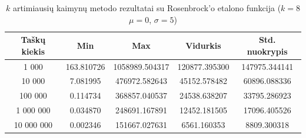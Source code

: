 \begin{table}[H]
    \centering
    \begin{tabular}{|c|c|c|c|c|}
        \hline
        \textbf{Taškų kiekis} & \textbf{Min} & \textbf{Max} & \textbf{Vidurkis} & \textbf{Std. nuokrypis} \\ \hline
        1 000        & 163.810726 & 1058989.504317 & 120877.395300 & 147975.344141 \\ \hline
        10 000       & 7.081995 & 476972.582643 & 45152.578482 & 60896.088336 \\ \hline
        100 000      & 0.114734 & 368857.040537 & 24538.638207 & 33795.286923 \\ \hline
        1 000 000    & 0.034870 & 248691.167891 & 12452.181505 & 17096.405526 \\ \hline
        10 000 000   & 0.002346 & 151667.027631 & 6561.160353 & 8809.300318 \\ \hline
    \end{tabular}
    \caption{$k$ artimiausių kaimynų metodo rezultatai su Rosenbrock'o etalono funkcija ($k = 8$ $\mu = 0$, $\sigma = 5$)}
\end{table}